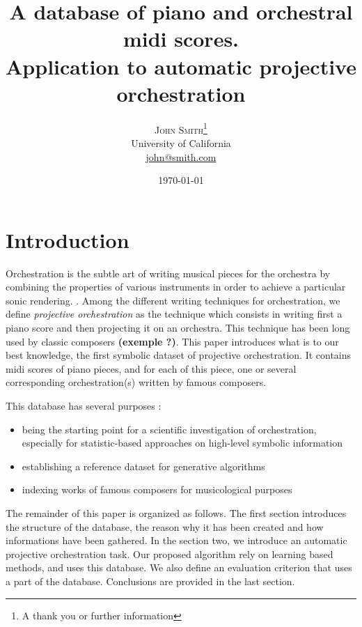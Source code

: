 \documentclass[twoside,twocolumn]{article}
\title{A database of piano and orchestral midi scores.\\Application to automatic projective orchestration} %
\author{%
\textsc{John Smith}\thanks{A thank you or further information} \\[1ex] %
\normalsize University of California \\ %
\normalsize \href{mailto:john@smith.com}{john@smith.com} %
}
\date{\today} %
\begin{document}
\maketitle


\section{Introduction}
Orchestration is the subtle art of writing musical pieces for the orchestra by combining the properties of various instruments in order to achieve a particular sonic rendering. \cite{koechli_orch,Rimsky-Korsakov:1873aa}. 
Among the different writing techniques for orchestration, we define \textit{projective orchestration} as the technique which consists in writing first a piano score and then projecting it on an orchestra. This technique has been long used by classic composers \textbf{(exemple ?)}.
This paper introduces what is to our best knowledge, the first symbolic dataset of projective orchestration.
It contains midi scores of piano pieces, and for each of this piece, one or several corresponding orchestration(s) written by famous composers.

This database has several purposes :
\begin{itemize}
\item being the starting point for a scientific investigation of orchestration, especially for statistic-based approaches on high-level symbolic information
\item establishing a reference dataset for generative algorithms 
\item indexing works of famous composers for musicological purposes
\end{itemize}

The remainder of this paper is organized as follows. The first section introduces the structure of the database, the reason why it has been created and how informations have been gathered. In the section two, we introduce an automatic projective orchestration task. Our proposed algorithm rely on learning based methods, and uses this database. We also define an evaluation criterion that uses a part of the database. Conclusions are provided in the last section.
\end{document}
